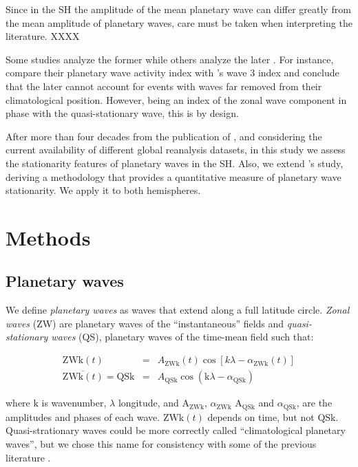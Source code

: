\documentclass[draft,linenumbers]{agujournal2018}
\begin{document}
Since in the SH the amplitude of the mean planetary wave can differ
greatly from the mean amplitude of planetary waves, care must be taken
when interpreting the literature. XXXX

Some studies analyze the former \citep[e.g.~][\citet{quintanar1995a},
\citet{raphael2004b}]{vanloon1972} while others analyze the later
\citep[e.g.~][\citet{turner2017}, \citet{irving2015}]{rao2004}. For
instance, \citet{irving2015} compare their planetary wave activity index
with \citet{raphael2004b}'s wave 3 index and conclude that the later
cannot account for events with waves far removed from their
climatological position. However, being an index of the zonal wave
component in phase with the quasi-stationary wave, this is by design.

After more than four decades from the publication of
\citet{vanloon1972}, and considering the current availability of
different global reanalysis datasets, in this study we assess the
stationarity features of planetary waves in the SH. Also, we extend
\citet{vanloon1972}'s study, deriving a methodology that provides a
quantitative measure of planetary wave stationarity. We apply it to both
hemispheres.

\section{Methods}

\subsection{Planetary waves}

We define \emph{planetary waves} as waves that extend along a full
latitude circle. \emph{Zonal waves} (ZW) are planetary waves of the
``instantaneous'' fields and \emph{quasi-stationary waves} (QS),
planetary waves of the time-mean field such that:

\begin{linenomath*}
\begin{eqnarray}\label{eq:ZW}
\mathrm{ZWk}(t) & = & A_\mathrm{ZWk}(t)\cos \left [ k\lambda - \alpha_\mathrm{ZWk}(t) \right ] \\ 
\overline{\mathrm{ZWk}(t)} = \mathrm{QSk} & = & A_\mathrm{QSk}\cos \left (  \mathrm{k}\lambda - \alpha_\mathrm{QSk} \right ) \label{eq:QS}
\end{eqnarray}
\end{linenomath*}

where \(\mathrm{k}\) is wavenumber, \(\lambda\) longitude, and
\(\mathrm{A_{ZWk}}\), \(\alpha_\mathrm{ZWk}\) \(\mathrm{A_{QSk}}\) and
\(\alpha_\mathrm{QSk}\), are the amplitudes and phases of each wave.
\(\mathrm{ZWk}(t)\) depends on time, but not \(\mathrm{QSk}\).
Quasi-strationary waves could be more correctly called ``climatological
planetary waves'', but we chose this name for consistency with some of
the previous literature \citep[e.g.~][]{quintanar1995, turner2017}.
\end{document}

